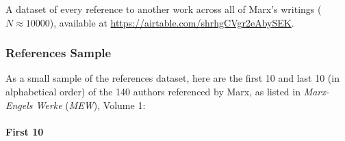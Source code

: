 A dataset of every reference to another work across all of Marx's writings ($N \approx 10000$), available at \href{https://airtable.com/shrhgCVgr2eAbySEK}{https://airtable.com/shrhgCVgr2eAbySEK}.


\subsubsection*{References Sample}

As a small sample of the references dataset, here are the first 10 and last 10 (in alphabetical order) of the 140 authors referenced by Marx, as listed in \textit{Marx-Engels Werke} (\textit{MEW}), Volume 1:

\paragraph*{First 10}

